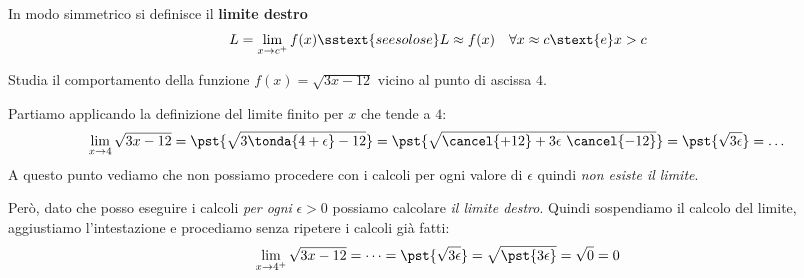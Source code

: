 \begin{definizione}
In modo simmetrico si definisce il \textbf{limite destro}
\[L = \lim_{x \rightarrow c^+} f(x) \sstext{se e solo se} 
L \approx {f(x)} \quad 
\forall x \approx c \stext{ e } x > c\]

\end{definizione}

\begin{esempio}
Studia il comportamento della funzione \(f(x)=\sqrt{3x-12}\) 
vicino al punto di ascissa \(4\).


Partiamo applicando la definizione del limite finito per \(x\) che tende a 
\(4\):
\[\lim_{x \to 4}\sqrt{3x-12} = \pst{\sqrt{3\tonda{4+\epsilon}-12}} = 
\pst{\sqrt{\cancel{+12}+3 \epsilon~\cancel{-12}}} = 
\pst{\sqrt{3 \epsilon}} = \dots\]
A questo punto vediamo che non possiamo procedere con i calcoli per ogni 
valore di \(\epsilon\) quindi \emph{non esiste il limite}.

Però, dato che posso eseguire i calcoli \emph{per ogni} \(\epsilon > 0\) 
possiamo calcolare \emph{il limite destro}. 
Quindi sospendiamo il calcolo del limite, 
aggiustiamo l'intestazione e procediamo senza ripetere i calcoli già fatti:
\[\lim_{x \to 4^+}\sqrt{3x-12} = \dots =
\pst{\sqrt{3 \epsilon}} = 
\sqrt{\pst{3 \epsilon}} = \sqrt{0} = 0\]
\end{esempio}


